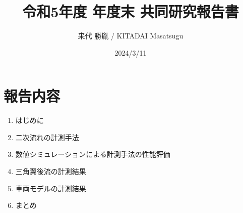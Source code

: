 \documentclass[twocolumn,a4j]{jsarticle}
\author{来代 勝胤 / KITADAI Masatsugu}
\title{令和5年度 年度末 共同研究報告書}
\date{2024/3/11}
\begin{document}
\columnseprule=0.1mm
\maketitle

\section*{報告内容}
\begin{enumerate}[1.]
  \item はじめに
  \item 二次流れの計測手法
  \item 数値シミュレーションによる計測手法の性能評価
  \item 三角翼後流の計測結果
  \item 車両モデルの計測結果
  \item まとめ
\end{enumerate}
\end{document}
